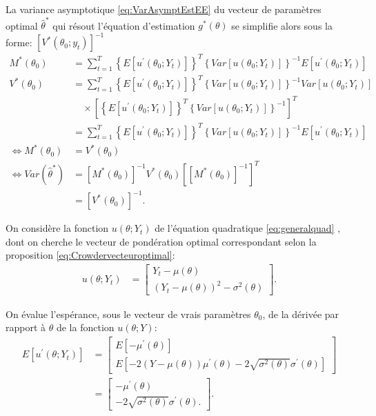 La variance asymptotique \eqref{eq:VarAsymptEstEE} du vecteur de
paramètres optimal $\hat\theta^{*}$ qui résout l'équation d'estimation
$g^{*}(\theta)$ se simplifie alors sous la forme:
$\left[V^{*}(\theta_0;y_t)\right]^{-1}$
\begin{align}
  \label{eq:13}
  M^{*}(\theta_0) &= \sum_{t=1}^{T} \left\{E
    \left[u^{\prime}(\theta_0;Y_t)
    \right]\right\}^{T}\left\{Var\left[u(\theta_0;Y_t)\right]
  \right\}^{-1} E\left[u^{\prime}(\theta_0;Y_t) \right] \\
  V^{*}(\theta_0) &= \sum_{t=1}^{T} \left\{E
    \left[u^{\prime}(\theta_0;Y_t)
    \right]\right\}^{T}\left\{Var\left[u(\theta_0;Y_t)\right]
  \right\}^{-1} Var\left[u(\theta_0;Y_t)\right] \nonumber\\
  &\quad \times \left[\left\{E \left[u^{\prime}(\theta_0;Y_t)
      \right]\right\}^{T}\left\{Var\left[u(\theta_0;Y_t)\right]
    \right\}^{-1}\right]^{T} \nonumber\\
  &= \sum_{t=1}^{T} \left\{E \left[u^{\prime}(\theta_0;Y_t)
    \right]\right\}^{T}\left\{Var\left[u(\theta_0;Y_t)\right]
  \right\}^{-1} E\left[u^{\prime}(\theta_0;Y_t) \right] \nonumber\\
  \Leftrightarrow M^{*}(\theta_0) &= V^{*}(\theta_0) \nonumber\\
  \Leftrightarrow Var(\hat\theta^{*}) &= \left[M^{*}(\theta_0)\right]^{-1} V^{*}(\theta_0) \left[\left[M^{*}(\theta_0)\right]^{-1}\right]^{T} \nonumber\\
  &= \left[V^{*}(\theta_0)\right]^{-1}.
\end{align}

On considère la fonction $u(\theta;Y_t)$ de l'équation quadratique
\eqref{eq:generalquad} , dont on cherche le vecteur de pondération
optimal correspondant selon la proposition
\eqref{eq:Crowdervecteuroptimal}:
\begin{align}
  \label{eq:15}
  u(\theta;Y_t) &= \begin{bmatrix}
    Y_t-\mu(\theta)\\
    (Y_t-\mu(\theta))^2-\sigma^2(\theta)
  \end{bmatrix}.
\end{align}

On évalue l'espérance, sous le vecteur de vrais paramètres $\theta_0$,
de la dérivée par rapport à $\theta$ de la fonction $u(\theta;Y)$:
\begin{align}
  \label{eq:16}
  E\left[u^{\prime}(\theta;Y_t)\right] &= \begin{bmatrix}
    E \left[-\mu^{\prime}(\theta)\right] \\
    E
    \left[-2(Y-\mu(\theta))\mu^{\prime}(\theta)-2\sqrt{\sigma^2(\theta)}\sigma^{\prime}(\theta)\right]
  \end{bmatrix} \nonumber\\
  &= \begin{bmatrix}
    -\mu^{\prime}(\theta) \\
    -2 \sqrt{\sigma^2(\theta)}\sigma^{\prime}(\theta).
  \end{bmatrix}.
\end{align}

